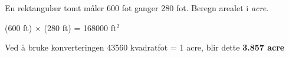 

En rektangulær tomt måler 600 fot ganger 280 fot. Beregn arealet i {\it acre}.







(600 ft) $\times$ (280 ft) = 168000 ft$^{2}$
 
\vskip 10pt

Ved å bruke konverteringen 43560 kvadratfot = 1 acre, blir dette {\bf 3.857 acre}











